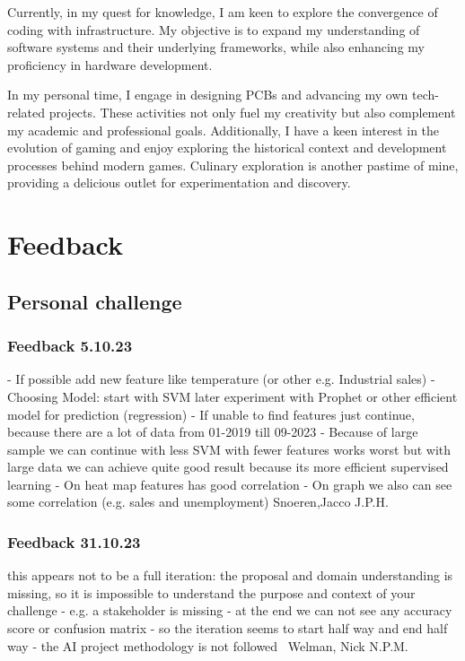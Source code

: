 \documentclass[a4paper, 11pt]{article}
\begin{document}
Currently, in my quest for knowledge, I am keen to explore the convergence of coding with infrastructure. My objective is to expand my understanding of software systems and their underlying frameworks, while also enhancing my proficiency in hardware development.
\medbreak

In my personal time, I engage in designing PCBs and advancing my own tech-related projects. These activities not only fuel my creativity but also complement my academic and professional goals. Additionally, I have a keen interest in the evolution of gaming and enjoy exploring the historical context and development processes behind modern games. Culinary exploration is another pastime of mine, providing a delicious outlet for experimentation and discovery.

\section{Feedback}

\subsection{Personal challenge}

\subsubsection{Feedback 5.10.23}
- If possible add new feature like temperature (or other e.g. Industrial sales)
- Choosing Model: start with SVM later experiment with Prophet or other efficient model for prediction (regression)
- If unable to find features just continue, because there are a lot of data from 01-2019 till 09-2023
- Because of large sample we can continue with less SVM with fewer features works worst but with large data we can achieve quite good result because its more efficient supervised learning
- On heat map features has good correlation
- On graph we also can see some correlation (e.g. sales and unemployment)
\smallbreak
 Snoeren,Jacco J.P.H.

\subsubsection{Feedback 31.10.23}
this appears not to be a full iteration: the proposal and domain understanding is missing, so it is impossible to understand the purpose and context of your challenge - e.g. a stakeholder is missing - at the end we can not see any accuracy score or confusion matrix - so the iteration seems to start half way and end half way - the AI project methodology is not followed
\smallbreak
~Welman, Nick N.P.M.
\end{document}
